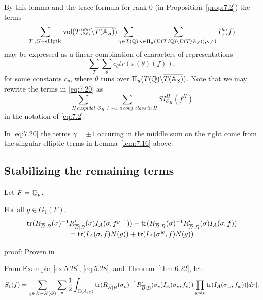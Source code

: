 By this lemma and the trace formula for rank 0 (in
Proposition~\ref{prop:7.2})
the terms 
\begin{equation}\label{eq:7.20}
\sum_{ T \; , G-\mathrm{elliptic} }
{\rm vol}(T(\mathbb{Q} )\backslash \overline{T(\mathbb{A} _S)})
\sum_{\gamma \in T(\mathbb{Q} )}
\sum_{ \kappa \in \Pi _u(D(T/{\mathbb Q})\backslash D(T/\mathbb{A} _S)),
 \kappa \neq 1}
I_\gamma ^\kappa (f)
\end{equation}
may be expressed as a linear combination of characters of representations 
\begin{equation}\label{eq:7.21}
\sum_T
\sum_\theta c_\theta tr(\pi (\theta )(f)),
\end{equation}
for some constants $c_\theta$, where $\theta$ runs over
$\Pi_u(T(\mathbb{Q} )\backslash \overline{T(\mathbb{A} _S)})$.
Note that we may rewrite the terms in \eqref{eq:7.20} as
\[
\sum_{H\ cuspidal}
\sum_{ {\mathcal O}_H\not= \pm 1,
a\ conj,
class\ in\ H}
SI_{{\mathcal O}_H}^H(f^H)
\]
in the notation of \eqref{eq:7.2}.

In \eqref{eq:7.20} the terms $\gamma =\pm 1$ occuring
in the middle sum on the right
come from the singular elliptic terms in Lemma~\ref{lem:7.16} above.

\subsection{Stabilizing the remaining terms}

Let $F=\mathbb{Q} _p$.

\begin{lemma}\label{lem:7.23} For all $g\in \overline{G_1(F)}$,
\[
\begin{array}{c}
{\rm tr}(R_{\overline{B}|B}(\sigma)^{-1}
R'_{\overline{B}|B}(\sigma)I_A(\sigma,f^{g^{-1}}))
-{\rm tr}(R_{\overline{B}|B}(\sigma)^{-1}
R'_{\overline{B}|B}(\sigma)I_A(\sigma,f))\\
={\rm tr}(I_A(\sigma,f)N(g))+{\rm tr}(I_A(\sigma^w,f)N(g))
\end{array}
\]
\end{lemma}

proof: Proven in \cite{J3}.

From Example~\ref{ex:5.28}, \eqref{eq:5.28}, and Theorem~\ref{thm:6.22}, let
\begin{equation}\label{eq:7.22}
S_1(f)=\sum_{\chi\in{\mathcal{X}}-{\mathcal{X}}(G)}
\sum_v {1\over 2}
\int_{\Pi(A,\chi)}
{\rm tr}(R_{\overline{B}|B}(\sigma_v)^{-1}
R'_{\overline{B}|B}(\sigma_v)I_A(\sigma_v,f_v))
\prod_{w\not= v}
{\rm tr}(I_A(\sigma_w,f_w))|d\pi |.
\end{equation}

